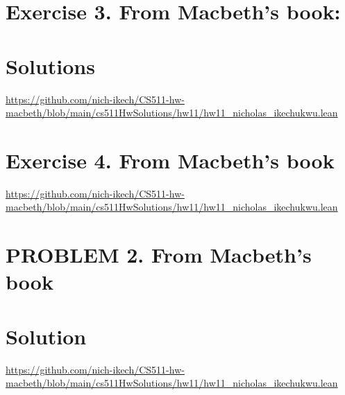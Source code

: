 \documentclass{article}
\begin{document}
\newpage

\section*{Exercise 3. From Macbeth’s book:}
\section*{Solutions}
\url{https://github.com/nich-ikech/CS511-hw-macbeth/blob/main/cs511HwSolutions/hw11/hw11_nicholas_ikechukwu.lean}

\newpage

\section*{Exercise 4. From Macbeth's book}

\url{https://github.com/nich-ikech/CS511-hw-macbeth/blob/main/cs511HwSolutions/hw11/hw11_nicholas_ikechukwu.lean}

\newpage

\section*{PROBLEM 2. From Macbeth's book}
\section*{Solution}

\url{https://github.com/nich-ikech/CS511-hw-macbeth/blob/main/cs511HwSolutions/hw11/hw11_nicholas_ikechukwu.lean}
\end{document}
